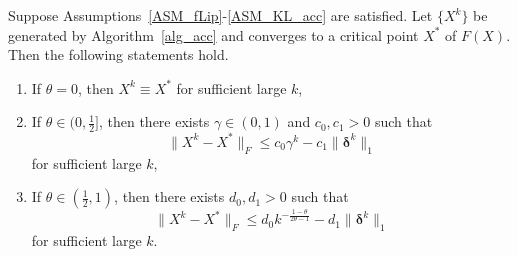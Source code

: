 \documentclass[twoside,11pt]{article}
\numberwithin{equation}{section}
\begin{document}
 \begin{theorem} 
  Suppose Assumptions~\ref{ASM_fLip}-\ref{ASM_KL_acc} are satisfied. 
   Let $\{X^{k}\} $ be generated by Algorithm~\ref{alg_acc} and converges to a critical point   $X^{*} $  of $F(X)$.  Then the following statements hold.
   \begin{enumerate}[label={(\roman*).}, leftmargin=*]
   \item If $\theta=0 $, then $X^{k}\equiv X^{*} $ for sufficient large $k$,
   \item If $\theta\in (0,\frac{1}{2}] $, then there exists $\gamma\in (0,1) $ and $c_{0}, c_1>0 $ such that 
     \begin{equation}
       \|X^{k}-X^{*}\|_{F} \le c_{0}\gamma^{k} - c_{1}\|\bm{\delta}^{k}\|_{1}
     \end{equation}
   for sufficient large $k $, 
   \item If $\theta\in (\frac{1}{2},1) $, then there exists $d_{0}, d_1>0 $ such that 
   \begin{equation}
     \|X^{k}-X^{*}\|_{F} \le d_{0}k^{-\frac{1-\theta}{2\theta-1}} - d_{1}\|\bm{\delta}^{k}\|_{1}
   \end{equation}
   for sufficient large $k $. 
   \end{enumerate}   
 \end{theorem}
 
\end{document}
